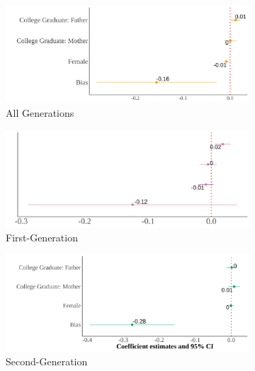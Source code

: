 \documentclass[12pt,english]{article}
\begin{document}
\begin{center}
\begin{figure}[!htb]
\centering
\caption{Relationship Between Self-Reported Asian Identity and Bias: By Generation MSA}
\label{plot01-regression-gen}
\begin{subfigure}{.48\textwidth}
\caption{All Generations}
\centering
\includegraphics[width=.9\linewidth]{figure/msa-skin-iat-regression-all-gens.png}
\end{subfigure}
\centering
\begin{subfigure}{.48\textwidth}
\caption{First-Generation}
\centering
\includegraphics[width=.9\linewidth]{figure/msa-skin-iat-regression-first-gen.png}
\end{subfigure}
\begin{subfigure}{.48\textwidth}
\caption{Second-Generation}
\centering
\includegraphics[width=.9\linewidth]{figure/msa-skin-iat-regression-second-gen.png}
\end{subfigure}
\begin{subfigure}{.48\textwidth}

\end{subfigure}
\end{figure}
\end{center}
\end{document}
